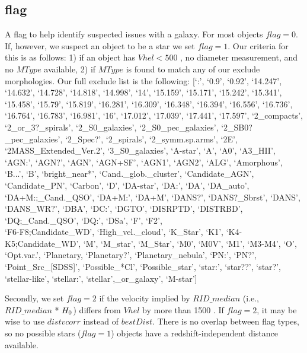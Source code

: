 \subsection{flag} \label{flag}
A flag to help identify suspected issues with a galaxy. For most objects $flag=0$. If, however, we suspect an object to be a star we set $flag=1$. Our criteria for this is as follows: 1) if an object has $Vhel < 500$ \kms, no diameter measurement, and no $MType$ available, 2) if $MType$ is found to match any of our exclude morphologies. Our full exclude list is the following: [`:', `0.9', `0.92', `14.247', `14.632', `14.728', `14.818', `14.998', `14', `15.159', `15.171', `15.242', `15.341', `15.458', `15.79', `15.819', `16.281', `16.309', `16.348', `16.394', `16.556', `16.736', `16.764', `16.783', `16.981', `16', `17.012', `17.039', `17.441', `17.597', `2\_compacts', `2\_or\_3?\_spirals', `2\_S0\_galaxies', `2\_S0\_pec\_galaxies', `2\_SB0?\_pec\_galaxies', `2\_Spec?', `2\_spirals', `2\_symm.sp.arms', `2E', `2MASS\_Extended\_Ver.2', `3\_S0\_galaxies', `A-star', `A', `A0', `A3\_HII', `AGN:', `AGN?', `AGN', `AGN+SF', `AGN1', `AGN2', `ALG', `Amorphous', `B...', `B', `bright\_near*', `Cand.\_glob.\_cluster', `Candidate\_AGN', `Candidate\_PN', `Carbon', `D', `DA-star', `DA:', `DA', `DA\_auto', `DA+M:;\_Cand.\_QSO', `DA+M:', `DA+M', `DANS?', `DANS?\_Sbrst', `DANS', `DANS\_WR?', `DBA', `DC:', `DGTO', `DISRPTD', `DISTRBD', `DQ;\_Cand.\_QSO', `DQ:', `DSa', `F', `F2', \\ `F6-F8;Candidate\_WD', `High\_vel.\_cloud', `K\_Star', `K1', `K4-K5;Candidate\_WD', `M', `M\_star', `M\_Star', `M0', `M0V', `M1', `M3-M4', `O', `Opt.var.', `Planetary, `Planetary?', `Planetary\_nebula', `PN:', `PN?', `Point\_Src\_[SDSS]', `Possible\_*Cl', `Possible\_star', `star:', `star??', `star?', `stellar-like', `stellar:', `stellar',\_or\_galaxy', `M-star']


Secondly, we set $flag = 2$ if the velocity implied by $RID\_median$ (i.e., $RID\_median$ * $H_{\rm 0}$) differs from $Vhel$ by more than 1500 \kms. If $flag = 2$, it may be wise to use $distvcorr$ instead of $bestDist$. There is no overlap between flag types, so no possible stars ($flag=1$) objects have a redshift-independent distance available.


